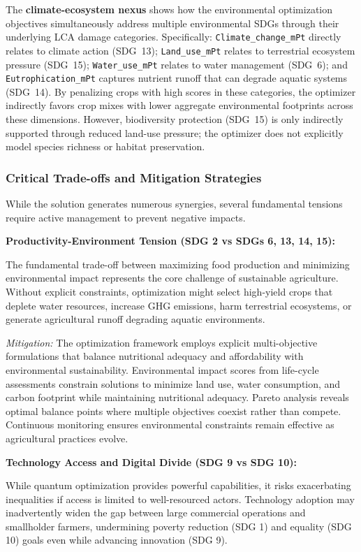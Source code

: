 \documentclass{oqireport}
\begin{document}
The \textbf{climate-ecosystem nexus} shows how the environmental optimization objectives simultaneously address multiple environmental SDGs through their underlying LCA damage categories. Specifically: \texttt{Climate\_change\_mPt} directly relates to climate action (SDG~13); \texttt{Land\_use\_mPt} relates to terrestrial ecosystem pressure (SDG~15); \texttt{Water\_use\_mPt} relates to water management (SDG~6); and \texttt{Eutrophication\_mPt} captures nutrient runoff that can degrade aquatic systems (SDG~14). By penalizing crops with high scores in these categories, the optimizer indirectly favors crop mixes with lower aggregate environmental footprints across these dimensions. However, biodiversity protection (SDG~15) is only indirectly supported through reduced land-use pressure; the optimizer does not explicitly model species richness or habitat preservation.

\subsubsection{Critical Trade-offs and Mitigation Strategies}

While the solution generates numerous synergies, several fundamental tensions require active management to prevent negative impacts.

\textbf{Productivity-Environment Tension (SDG 2 vs SDGs 6, 13, 14, 15):}

The fundamental trade-off between maximizing food production and minimizing environmental impact represents the core challenge of sustainable agriculture. Without explicit constraints, optimization might select high-yield crops that deplete water resources, increase GHG emissions, harm terrestrial ecosystems, or generate agricultural runoff degrading aquatic environments.

\textit{Mitigation:} The optimization framework employs explicit multi-objective formulations that balance nutritional adequacy and affordability with environmental sustainability. Environmental impact scores from life-cycle assessments constrain solutions to minimize land use, water consumption, and carbon footprint while maintaining nutritional adequacy. Pareto analysis reveals optimal balance points where multiple objectives coexist rather than compete. Continuous monitoring ensures environmental constraints remain effective as agricultural practices evolve.

\textbf{Technology Access and Digital Divide (SDG 9 vs SDG 10):}

While quantum optimization provides powerful capabilities, it risks exacerbating inequalities if access is limited to well-resourced actors. Technology adoption may inadvertently widen the gap between large commercial operations and smallholder farmers, undermining poverty reduction (SDG 1) and equality (SDG 10) goals even while advancing innovation (SDG 9).
\end{document}
